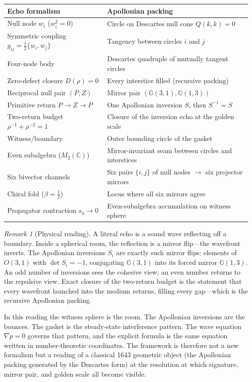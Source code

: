 \documentclass[11pt,a4paper]{article}
\theoremstyle{plain}
\theoremstyle{definition}
\theoremstyle{remark}
\newtheorem{remark}[theorem]{Remark}
\numberwithin{equation}{section}
\newcommand{\Cl}{\mathbb{G}}
\begin{document}
\begin{center}
\renewcommand{\arraystretch}{1.18}
\begin{tabular}{ll}
\toprule
\textbf{Echo formalism} & \textbf{Apollonian packing} \\
\midrule
Null node \(w_i\) (\(w_i^2=0\)) & Circle on Descartes null cone \(Q(k,k)=0\) \\
Symmetric coupling \(g_{ij}=\tfrac12\{w_i,w_j\}\) & Tangency between circles \(i\) and \(j\) \\
Four-node body & Descartes quadruple of mutually tangent circles \\
Zero-defect closure \(D(\rho)=0\) & Every interstice filled (recursive packing) \\
Reciprocal null pair \((P,Z)\) & Mirror pair \((\Cl(3,1),\Cl(1,3))\) \\
Primitive return \(P\to Z\to P\) & One Apollonian inversion \(S\), then \(S^{-1}=S\) \\
Two-return budget \(\rho^{-1}+\rho^{-2}=1\) & Closure of the inversion echo at the golden scale \\
Witness/boundary & Outer bounding circle of the gasket \\
Even subalgebra (\(M_2(\mathbb{C})\)) & Mirror-invariant seam between circles and interstices \\
Six bivector channels & Six pairs \(\{i,j\}\) of null nodes \(\to\) six projector mirrors \\
Chiral fold (\(\beta=\tfrac12\)) & Locus where all six mirrors agree \\
Propagator contraction \(s_4\to0\) & Even-subalgebra accumulation on witness sphere \\
\bottomrule
\end{tabular}
\end{center}

\begin{remark}[Physical reading]
\label{rmk:echo-reflection}
A literal echo is a sound wave reflecting off a boundary.  Inside a
spherical room, the reflection is a mirror flip---the wavefront inverts.
The Apollonian inversions \(S_i\) are exactly such mirror flips:
elements of \(O(3,1)\) with \(\det S_i=-1\), conjugating
\(\Cl(3,1)\) into its forced mirror \(\Cl(1,3)\).  An odd number of
inversions sees the cohesive view; an even number returns to the
repulsive view.  Exact closure of the two-return budget is the
statement that every wavefront launched into the medium returns,
filling every gap---which is the recursive Apollonian packing.

In this reading the witness sphere is the room.  The Apollonian
inversions are the bounces.  The gasket is the steady-state interference
pattern.  The wave equation \(\nabla p=0\) governs that pattern, and the
explicit formula is the same equation written in number-theoretic
coordinates.  The framework is therefore not a new formalism but a
reading of a classical 1643 geometric object (the Apollonian packing
generated by the Descartes form) at the resolution at which signature,
mirror pair, and golden scale all become visible.
\end{remark}
\end{document}
